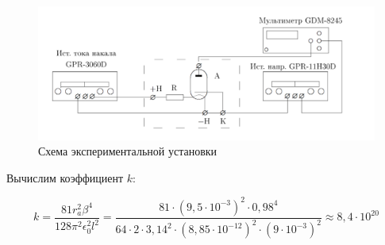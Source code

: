 \documentclass[a4paper, 12pt]{article}%
\begin{document}
	\begin{figure}[H]
		\centering
		\includegraphics[width=0.8\linewidth]{scheme}
		\caption{Схема экспериментальной установки}
		\label{fig:scheme}
	\end{figure}
	Вычислим коэффициент $ k $:
	
	\begin{equation}\label{}
		k = \dfrac{81r_a^2\beta^4}{128\pi^2\epsilon_0^2l^2} = \dfrac {81\cdot(9,5\cdot10^{-3})^2\cdot0,98^4}{64\cdot2\cdot3,14^2\cdot(8,85\cdot10^{-12})^2\cdot(9\cdot10^{-3})^2} \approx 8,4 \cdot 10^{20}
	\end{equation}
\end{document}
